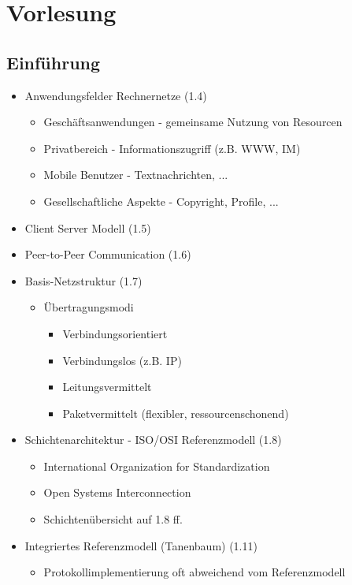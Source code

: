 

\chapter{Vorlesung}

\section{Einführung}
\begin{itemize}
	\item Anwendungsfelder Rechnernetze (1.4)
	\begin{itemize}
		\item Geschäftsanwendungen - gemeinsame Nutzung von 							Resourcen
		\item Privatbereich - Informationszugriff (z.B. WWW, IM)
		\item Mobile Benutzer - Textnachrichten, ...
		\item Gesellschaftliche Aspekte - Copyright, Profile, ...
	\end{itemize}
	\item Client Server Modell (1.5)
	\item Peer-to-Peer Communication (1.6)
	\item Basis-Netzstruktur (1.7)
	\begin{itemize}
		\item Übertragungsmodi
		\begin{itemize}	
			\item Verbindungsorientiert
			\item Verbindungslos (z.B. IP)
			\item Leitungsvermittelt
			\item Paketvermittelt (flexibler, 												ressourcenschonend)
		\end{itemize}
	\end{itemize}
	\item Schichtenarchitektur - ISO/OSI Referenzmodell (1.8)
	\begin{itemize}
		\item International Organization for Standardization
		\item Open Systems Interconnection
		\item Schichtenübersicht auf 1.8 ff.
	\end{itemize}
	\item Integriertes Referenzmodell (Tanenbaum) (1.11)
	\begin{itemize}
		\item Protokollimplementierung oft abweichend vom Referenzmodell

\end{itemize}
\end{itemize}

